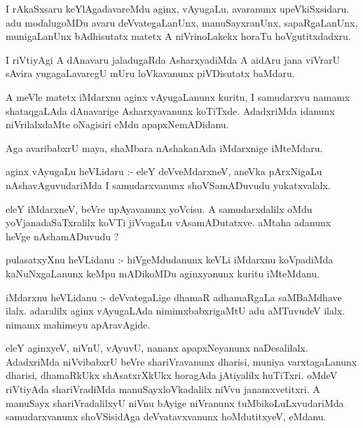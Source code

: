 \documentclass{article}
\begin{document}
\begin{mn}
I  rAkaSxsaru  keYlAgadavareMdu  aginx,  vAyugaLu,  avaranunx  upeVkiSxsidaru.  adu  
modalugoMDu  avaru  deVvategaLanUnx,  manuSayxranUnx,  sapaRgaLanUnx,  munigaLanUnx  
bAdhisutatx  matetx  A  niVrinoLakekx  horaTu  hoVgutitxdadxru.
\end{mn}

\begin{mn}
I  riVtiyAgi  A  dAnavaru  jaladugaRda  AsharxyadiMda  A  aidAru  jana  viVrarU  sAvira  
yugagaLavaregU  mUru  loVkavanunx  piVDisutatx  baMdaru.
\end{mn}

\begin{mn}
A  meVle  matetx  iMdarxnu  aginx  vAyugaLanunx  kuritu,  I  samudarxvu  namamx  
shataqgaLAda  dAnavarige  Asharxyavanunx  koTiTxde.  AdadxriMda  idanunx  niVrilalxdaMte  
oNagisiri  eMdu  apapxNemADidanu.
\end{mn}

\begin{mn}
Aga  avaribabxrU  maya,  shaMbara  nAshakanAda  iMdarxnige  iMteMdaru.
\end{mn}

\begin{mn}
aginx  vAyugaLu  heVLidaru :- eleY  deVveMdarxneV,  aneVka  pArxNigaLu  nAshavAguvudariMda  
I  samudarxvanunx  shoVSamADuvudu  yukatxvalalx.
\end{mn}

\begin{mn}
eleY  iMdarxneV,  beVre  upAyavanunx  yoVcisu.  A  samudarxdalilx  oMdu  yoVjanadaSaTxralilx  
koVTi  jiVvagaLu  vAsamADutatxve.  aMtaha  adanunx  heVge  nAshamADuvudu ?
\end{mn}

\begin{mn}
pulasatxyXnu  heVLidanu :- hiVgeMdudanunx  keVLi  iMdarxnu  koVpadiMda  kaNuNxgaLanunx  keMpu  
mADikoMDu  aginxyanunx  kuritu  iMteMdanu.
\end{mn}

\begin{mn}
iMdarxnu  heVLidanu :- deVvategaLige  dhamaR  adhamaRgaLa  saMBaMdhave  ilalx.  adaralilx  
aginx  vAyugaLAda  nimimxbabxrigaMtU  adu  aMTuvudeV  ilalx.  nimamx  mahimeyu  apAravAgide.
\end{mn}

\begin{mn}
eleY  aginxyeV,  niVnU,  vAyuvU,  nananx  apapxNeyanunx  naDesalilalx.  AdadxriMda  niVvibabxrU  
beVre  shariVravanunx  dharisi,  muniya  varxtagaLanunx  dharisi,  dhamaRkUkx  shAsatxrXkUkx  
horagAda  jAtiyalilx  huTiTxri.  oMdeV  riVtiyAda  shariVradiMda  manuSayxloVkadalilx  niVvu  
janamxvetitxri.  A  manuSayx  shariVradalilxyU  niVnu  bAyige  niVranunx  tuMbikoLuLxvudariMda  
samudarxvanunx  shoVSisidAga  deVvatavxvanunx  hoMdutitxyeV,  eMdanu.
\end{mn}
\end{document}

